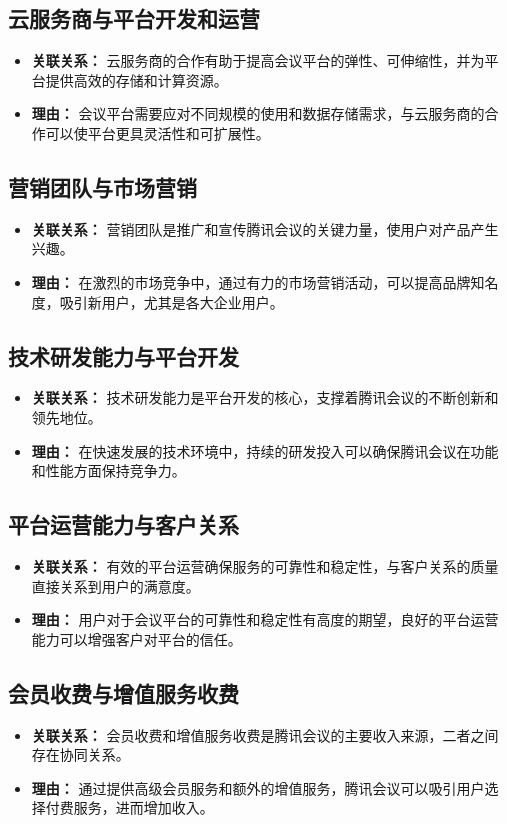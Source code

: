 \documentclass[a4paper,12pt]{article}
\begin{document}
    \subsection{云服务商与平台开发和运营}
    \begin{itemize}
        \item\textbf{关联关系：} 云服务商的合作有助于提高会议平台的弹性、可伸缩性，并为平台提供高效的存储和计算资源。
        \item \textbf{理由：} 会议平台需要应对不同规模的使用和数据存储需求，与云服务商的合作可以使平台更具灵活性和可扩展性。
    \end{itemize}
    \subsection{营销团队与市场营销}
    \begin{itemize}
        \item\textbf{关联关系：} 营销团队是推广和宣传腾讯会议的关键力量，使用户对产品产生兴趣。
        \item\textbf{理由：} 在激烈的市场竞争中，通过有力的市场营销活动，可以提高品牌知名度，吸引新用户，尤其是各大企业用户。
    \end{itemize}
    \subsection{技术研发能力与平台开发}
    \begin{itemize}
        \item\textbf{关联关系：} 技术研发能力是平台开发的核心，支撑着腾讯会议的不断创新和领先地位。
        \item\textbf{理由：} 在快速发展的技术环境中，持续的研发投入可以确保腾讯会议在功能和性能方面保持竞争力。
    \end{itemize}
    \subsection{平台运营能力与客户关系}
    \begin{itemize}
        \item\textbf{关联关系：} 有效的平台运营确保服务的可靠性和稳定性，与客户关系的质量直接关系到用户的满意度。
        \item\textbf{理由：} 用户对于会议平台的可靠性和稳定性有高度的期望，良好的平台运营能力可以增强客户对平台的信任。
    \end{itemize}
    \subsection{会员收费与增值服务收费}
    \begin{itemize}
        \item\textbf{关联关系：} 会员收费和增值服务收费是腾讯会议的主要收入来源，二者之间存在协同关系。
        \item\textbf{理由：} 通过提供高级会员服务和额外的增值服务，腾讯会议可以吸引用户选择付费服务，进而增加收入。
    \end{itemize}
\end{document}
